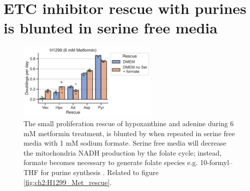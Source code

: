 \section{ETC inhibitor rescue with purines is blunted in serine free media}
\begin{figure}[ht]
    \centering
    \includegraphics[width=0.6\textwidth]{figures/chap2/app/H1299_Met_rescue_noSer.pdf}
    \caption[ETC inhibitor purine rescue in serine free media.]{
    The small proliferation rescue of hypoxanthine and adenine during 6 mM metformin treatment, is blunted by when repeated in serine free media with 1 mM sodium formate.
    Serine free media will decrease the mitochondria NADH production by the folate cycle; instead, formate becomes necessary to generate folate species e.g. 10-formyl–THF for purine synthesis \cite{Ducker2016-mz, Ducker2017-mb, Yang2020-fs}.
    Related to figure \ref{fig:ch2:H1299_Met_rescue}.
    }
    \label{fig:app_ch2:H1299_Met_rescue_noSer}
\end{figure}




\newpage
